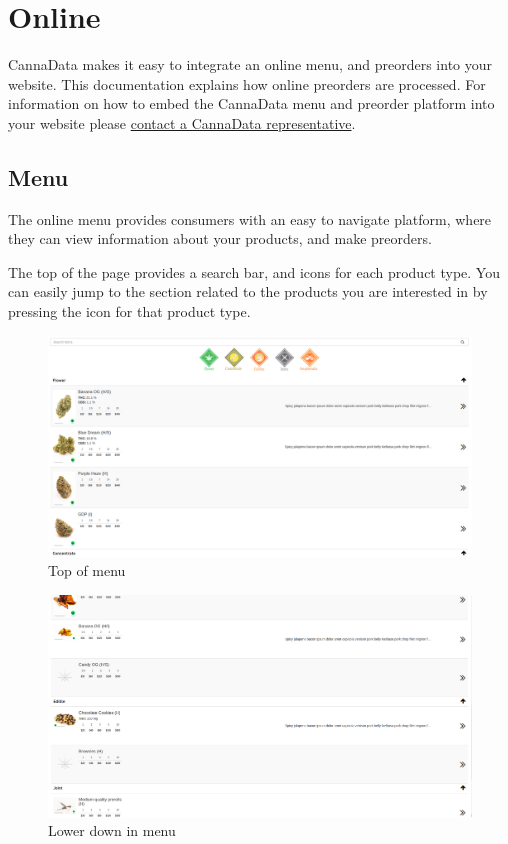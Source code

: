 \documentclass[]{book}
\theoremstyle{definition}
\theoremstyle{definition}
\theoremstyle{definition}
\theoremstyle{remark}
\begin{document}
\chapter{Online}\label{online}

CannaData makes it easy to integrate an online menu, and preorders into
your website. This documentation explains how online preorders are
processed. For information on how to embed the CannaData menu and
preorder platform into your website please
\href{mailto:carl@cannadatasolutions.com}{contact a CannaData
representative}.

\section{Menu}\label{menu}

The online menu provides consumers with an easy to navigate platform,
where they can view information about your products, and make preorders.

The top of the page provides a search bar, and icons for each product
type. You can easily jump to the section related to the products you are
interested in by pressing the icon for that product type.

\begin{figure}
\centering
\includegraphics{images/M1.png}
\caption{Top of menu}
\end{figure}

\begin{figure}
\centering
\includegraphics{images/M2.png}
\caption{Lower down in menu}
\end{figure}
\end{document}

